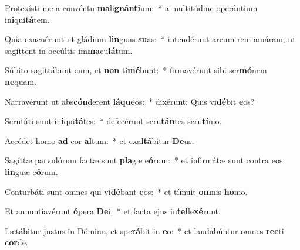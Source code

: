 \item Protexísti me a convéntu \textbf{ma}li\textbf{gnán}\textbf{ti}um:~* a multitúdine operántium in\textbf{i}qui\textbf{tá}tem.
\item Quia exacuérunt ut gládium \textbf{lin}guas \textbf{su}as:~* intendérunt arcum rem amáram, ut sagíttent in occúltis im\textbf{ma}cu\textbf{lá}tum.
\item Súbito sagittábunt eum, et \textbf{non} ti\textbf{mé}bunt:~* firmavérunt sibi ser\textbf{mó}nem \textbf{ne}quam.
\item Narravérunt ut abs\textbf{cón}derent \textbf{lá}\textbf{que}os:~* dixérunt: Quis vi\textbf{dé}bit \textbf{e}os?
\item Scrutáti sunt in\textbf{i}qui\textbf{tá}tes:~* defecérunt scru\textbf{tán}tes scru\textbf{tí}nio.
\item Accédet homo \textbf{ad} cor \textbf{al}tum:~* et exal\textbf{tá}bitur \textbf{De}us.
\item Sagíttæ parvulórum factæ sunt \textbf{pla}gæ e\textbf{ó}rum:~* et infirmátæ sunt contra eos \textbf{lin}guæ e\textbf{ó}rum.
\item Conturbáti sunt omnes qui vi\textbf{dé}bant \textbf{e}os:~* et tímuit \textbf{om}nis \textbf{ho}mo.
\item Et annuntiavérunt \textbf{ó}pera \textbf{De}i,~* et facta ejus in\textbf{tel}le\textbf{xé}runt.
\item Lætábitur justus in Dómino, et spe\textbf{rá}bit in \textbf{e}o:~* et laudabúntur omnes \textbf{rec}ti \textbf{cor}de.
